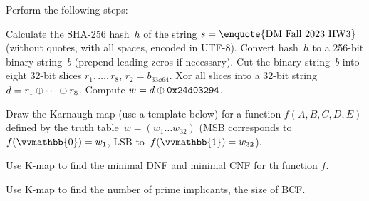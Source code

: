 \documentclass[a4paper,12pt]{article}
\begin{document}

\begin{tasks}
    \item Perform the following steps:
    \begin{subtasks}
        \item Calculate the SHA-256 hash~$h$ of the string $s = \text{\enquote{DM Fall 2023 HW3}}$ (without quotes, with all spaces, encoded in UTF-8).
        Convert hash~$h$ to a 256-bit binary string~$b$ (prepend leading zeros if necessary).
        Cut the binary string~$b$ into eight 32-bit slices $r_1, \dotsc, r_8$, \eg $r_2 = b_{33 \dd 64}$.
        Xor all slices into a 32-bit string $d = r_1 \oplus \dotsb \oplus r_8$.
        Compute $w = d \oplus \mathtt{0x24d03294}$.

        \item Draw the Karnaugh map (use a template below) for a function $f(A,B,C,D,E)$ defined by the truth table~$w = (w_{1} \dots w_{32})$ (MSB corresponds to~$f(\vvmathbb{0}) = w_{1}$, LSB to~$f(\vvmathbb{1}) = w_{32}$).

        \item Use K-map to find the minimal DNF and minimal CNF for th function $f$.

        \item Use K-map to find the number of prime implicants, \ie the size of BCF\@.

\end{subtasks}
\end{tasks}
\end{document}
